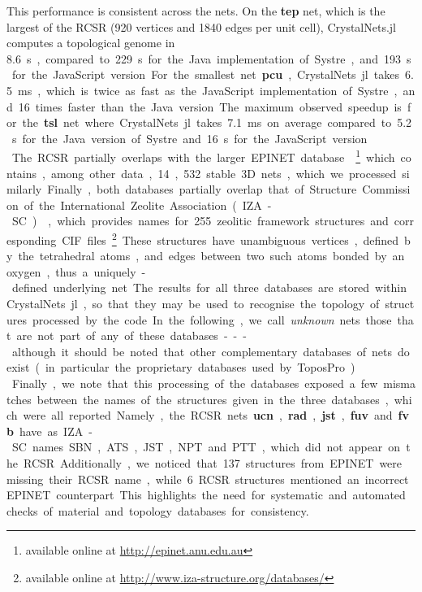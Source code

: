 \documentclass[main.tex]{subfiles}
\begin{document}
This performance is consistent across the nets. On the \textbf{tep} net, which is the largest of the RCSR (920 vertices and 1840 edges per unit cell), CrystalNets.jl computes a topological genome in \SI{8.6}s, compared to \SI{229}s for the Java implementation of Systre, and \SI{193}s for the JavaScript version. For the smallest net \textbf{pcu}, CrystalNets.jl takes \SI{6.5}{ms}, which is twice as fast as the JavaScript implementation of Systre, and 16 times faster than the Java version. The maximum observed speedup is for the \textbf{tsl} net where CrystalNets.jl takes \SI{7.1}{ms} on average compared to \SI{5.2}s for the Java version of Systre and \SI{16}s for the JavaScript version.\\

The RCSR partially overlaps with the larger EPINET database \autocite{Epinet0} \footnote{available online at \url{http://epinet.anu.edu.au}} which contains, among other data, 14,532 stable 3D nets, which we processed similarly. Finally, both databases partially overlap that of Structure Commission of the International Zeolite Association (IZA-SC) \autocite{IZA}, which provides names for 255 zeolitic framework structures and corresponding CIF files.\footnote{available online at \url{http://www.iza-structure.org/databases/}} These structures have unambiguous vertices, defined by the tetrahedral atoms, and edges between two such atoms bonded by an oxygen, thus a uniquely-defined underlying net.

The results for all three databases are stored within CrystalNets.jl, so that they may be used to recognise the topology of structures processed by the code. In the following, we call \emph{unknown} nets those that are not part of any of these databases --- although it should be noted that other complementary databases of nets do exist (in particular the proprietary databases used by ToposPro).\\

Finally, we note that this processing of the databases exposed a few mismatches between the names of the structures given in the three databases, which were all reported. Namely, the RCSR nets \textbf{ucn}, \textbf{rad}, \textbf{jst}, \textbf{fuv} and \textbf{fvb} have as IZA-SC names SBN, ATS, JST, NPT and PTT, which did not appear on the RCSR. Additionally, we noticed that 137 structures from EPINET were missing their RCSR name, while 6 RCSR structures mentioned an incorrect EPINET counterpart.
This highlights the need for systematic and automated checks of material and topology databases for consistency.
\end{document}
